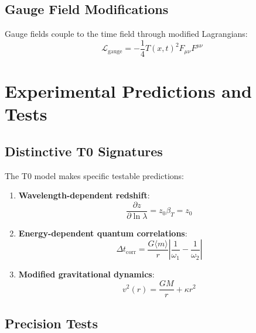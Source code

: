 \documentclass[twocolumn,aps,prl]{revtex4-2}
\newcommand{\Tfieldt}{T(x,t)}
\begin{document}
	\subsection{Gauge Field Modifications}
	\label{subsec:gauge_modifications}
	
	Gauge fields couple to the time field through modified Lagrangians:
	\begin{equation}
		\mathcal{L}_{\text{gauge}} = -\frac{1}{4}\Tfieldt^2 F_{\mu\nu}F^{\mu\nu}
		\label{eq:gauge_lagrangian}
	\end{equation}
	
	\section{Experimental Predictions and Tests}
	\label{sec:experimental_predictions}
	
	\subsection{Distinctive T0 Signatures}
	\label{subsec:distinctive_signatures}
	
	The T0 model makes specific testable predictions:
	
	\begin{enumerate}
		\item \textbf{Wavelength-dependent redshift}:
		\begin{equation}
			\frac{\partial z}{\partial \ln\lambda} = z_0 \beta_T = z_0
			\label{eq:redshift_derivative}
		\end{equation}
		
		\item \textbf{Energy-dependent quantum correlations}:
		\begin{equation}
			\Delta t_{\text{corr}} = \frac{G\langle m \rangle}{r} \left|\frac{1}{\omega_1} - \frac{1}{\omega_2}\right|
			\label{eq:correlation_delay}
		\end{equation}
		
		\item \textbf{Modified gravitational dynamics}:
		\begin{equation}
			v^2(r) = \frac{GM}{r} + \kappa r^2
			\label{eq:rotation_curve}
		\end{equation}
	\end{enumerate}
	
	\subsection{Precision Tests}
	\label{subsec:precision_tests}
	
\end{document}
